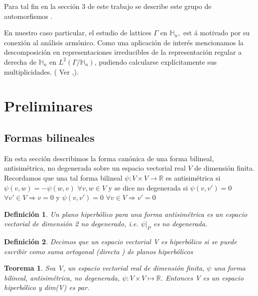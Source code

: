\documentclass[12pt]{article}
\newtheorem{theorem}{Teorema}
\newtheorem{definition}{Definición}
\begin{document}
Para tal fin en la sección 3 de este trabajo se describe este grupo de
automorfismos .

En nuestro caso particular, el estudio de lattices $\Gamma $ en $\mathbb{H}_n,$ est%
á motivado por su conexión al análisis armónico. Como una
aplicación de inter\'{e}s mencionamos la descomposición en
representaciones irreducibles de la representación regular a derecha de
$\mathbb{H}_n$ en $L^2(\Gamma /\mathbb{H}_n)$, pudiendo calcularse
explícitamente sus multiplicidades. ( Ver \cite{Fo} ,\cite{Th}).

\section{Preliminares}
\subsection{Formas bilineales}
En esta sección describimos la forma canónica de una forma bilineal,
antisimétrica, no degenerada sobre un espacio vectorial real $V$ de dimensión finita. 
Recordamos que una tal forma bilineal $\psi :V\times V\rightarrow \mathbb{R}$
es antisimétrica si $\psi(v,w)=-\psi(w,v)$ $\forall v,w \in V$  y se dice no degenerada si 
$\psi(v,v')=0$ $\forall v' \in V \Rightarrow v = 0$  y 
$\psi(v,v')=0$ $\forall v \in V \Rightarrow v' = 0$

\begin{definition} 
 Un plano hiperbólico para una forma antisimétrica es un espacio vectorial de dimensión 2 no degenerado,
  i.e. $\psi|_P$ es no degenerada. 
\end{definition}

\begin{definition}   
 Decimos que un espacio vectorial V es hiperbólico si se puede escribir como suma ortogonal (directa ) de
 planos hiperbólicos
\end{definition}

\begin{theorem} \label{Lang-8.1}
 Sea V, un espacio vectorial real de dimensión finita, $\psi$ una forma bilineal, antisimétrica, no degenerada, 
 $\psi:V\times V\mapsto \mathbb{R}$. Entonces V es un espacio hiperbólico y dim(V) es par.
\end{theorem}
\end{document}
